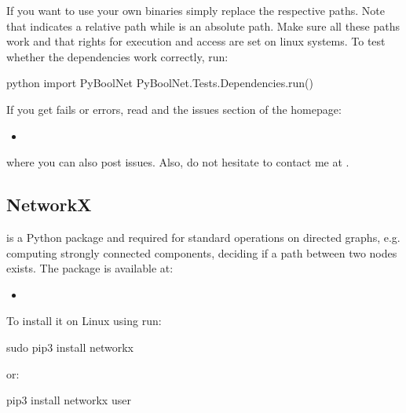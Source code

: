 \documentclass[letterpaper,10pt,english]{sphinxmanual}
\begin{document}
If you want to use your own binaries simply replace the respective paths. Note that  indicates a relative path while \sphinxcode{/} is an absolute path.
Make sure all these paths work and that rights for execution and access are set on linux systems.
To test whether the dependencies work correctly, run:

\begin{sphinxVerbatim}[commandchars=\\\{\}]
\PYGZdl{} python
\PYGZgt{}\PYGZgt{}\PYGZgt{} import PyBoolNet
\PYGZgt{}\PYGZgt{}\PYGZgt{} PyBoolNet.Tests.Dependencies.run()
\end{sphinxVerbatim}

If you get fails or errors, read {\hyperref[\detokenize{Installation:installation-troubleshooting}]{}} and the issues section of the homepage:
\begin{itemize}
\item {} 

\end{itemize}

where you can also post issues. Also, do not hesitate to contact me at .


\subsection{NetworkX}
\label{\detokenize{Installation:installation-networkx}}\label{\detokenize{Installation:networkx}}
 is a Python package and required for standard operations on directed graphs, e.g. computing strongly connected components,
deciding if a path between two nodes exists.
The package is available at:
\begin{itemize}
\item {} 

\end{itemize}

To install it on Linux using  run:

\begin{sphinxVerbatim}[commandchars=\\\{\}]
\PYGZdl{} sudo pip3 install networkx
\end{sphinxVerbatim}

or:

\begin{sphinxVerbatim}[commandchars=\\\{\}]
\PYGZdl{} pip3 install networkx \PYGZhy{}\PYGZhy{}user
\end{sphinxVerbatim}
\end{document}
